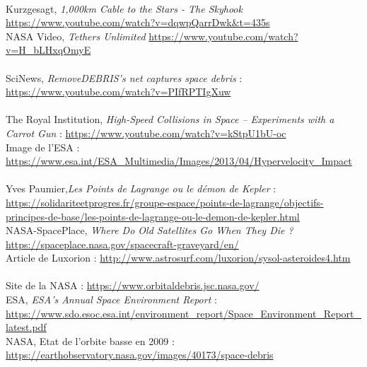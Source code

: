 \documentclass[a4paper,1pt]{article}
\begin{document}
\begin{thebibliography}{11}
~\\
		Kurzgesagt, \textit{1,000km Cable to the Stars - The Skyhook}
		\url{https://www.youtube.com/watch?v=dqwpQarrDwk&t=435s}\\

		NASA Video, \textit{Tethers Unlimited}
		\url{https://www.youtube.com/watch?v=H_bLHxqOmyE}\\
		
~\\
		SciNews, \textit{RemoveDEBRIS's net captures space debris} : 
		\url{https://www.youtube.com/watch?v=PIfRPTIgXuw}\\

~\\
		The Royal Institution, \textit{High-Speed Collisions in Space – Experiments with a Carrot Gun} : 			\url{https://www.youtube.com/watch?v=kStpU1bU-oc}\\
		
		Image de l'ESA : \url{https://www.esa.int/ESA_Multimedia/Images/2013/04/Hypervelocity_Impact}\\
		
~\\
		Yves Paumier,\textit{Les Points de Lagrange ou le démon de Kepler} : 
		\url{https://solidariteetprogres.fr/groupe-espace/points-de-lagrange/objectifs-principes-de-base/les-points-de-lagrange-ou-le-demon-de-kepler.html}\\
		
		NASA-SpacePlace, \textit{Where Do Old Satellites Go When They Die ?}
		\url{https://spaceplace.nasa.gov/spacecraft-graveyard/en/}\\
		
		Article de Luxorion : \url{http://www.astrosurf.com/luxorion/sysol-asteroides4.htm}\\

~\\
	Site de la NASA : \url{https://www.orbitaldebris.jsc.nasa.gov/}\\
	
	ESA, \textit{ESA's Annual Space Environment Report} : \url{https://www.sdo.esoc.esa.int/environment_report/Space_Environment_Report_latest.pdf}\\
	
	NASA, Etat de l'orbite basse en 2009 : \url{https://earthobservatory.nasa.gov/images/40173/space-debris}\\
	

\end{thebibliography}
\end{document}
